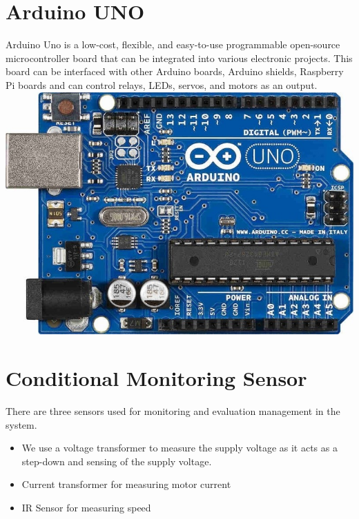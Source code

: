 \section{Arduino UNO}
Arduino Uno is a low-cost, flexible, and easy-to-use programmable open-source microcontroller board that can be integrated into various electronic projects. This board can be interfaced with other Arduino boards, Arduino shields, Raspberry Pi boards and can control relays, LEDs, servos, and motors as an output.\\
{\includegraphics[height=0.2\textheight]{Figures/arduino.jpg}}

\section{Conditional Monitoring Sensor}
There are three sensors used for monitoring and evaluation management in the system.\\
\begin{itemize}
    \item {We use a voltage transformer to measure the supply voltage as it acts as a step-down and sensing of the supply voltage.}
    \item {Current transformer for measuring motor current}
    \item {IR Sensor for measuring speed}
\end{itemize}
